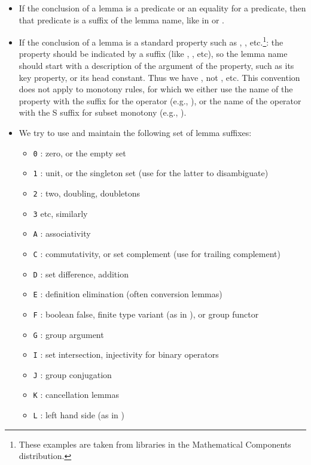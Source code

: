 \begin{itemize}
\begin{itemize}
  \item If the conclusion of a lemma is a predicate or an equality for
    a predicate, then that predicate is a suffix of the lemma name,
    like in  or .
  \item If the conclusion of a lemma is a standard property such as
    \C{\\char}, \C{<|}, etc.\footnote{These examples are taken from
      libraries in the Mathematical Components distribution.}:
    the property should be
    indicated by a suffix (like , , etc), so
    the lemma name
    should start with a description of the argument of the property, such as
    its key property, or its head constant.
    Thus we have , not , etc. This
    convention does not apply to monotony rules, for which we either
    use the name of the property with the suffix for the operator
    (e.g., ), or the name of the operator with the S
    suffix for subset monotony (e.g., ).
  \item We try to use and maintain the following set of lemma suffixes:
    \begin{itemize}
    \item {\tt 0} : zero, or the empty set
    \item {\tt 1} : unit, or the singleton set (use  for
      the latter to disambiguate)
    \item {\tt 2} : two, doubling, doubletons
    \item {\tt 3} etc, similarly
    \item {\tt A} : associativity
    \item {\tt C} : commutativity, or set complement (use 
      for trailing complement)
    \item {\tt D} : set difference, addition
    \item {\tt E} : definition elimination (often conversion
      lemmas)
    \item {\tt F} : boolean false, finite type variant (as in
      ), or group functor
    \item {\tt G} : group argument
    \item {\tt I} : set intersection, injectivity for binary operators
    \item {\tt J} : group conjugation
    \item {\tt K} : cancellation lemmas
    \item {\tt L} : left hand side (as in )

\end{itemize}
\end{itemize}
\end{itemize}
